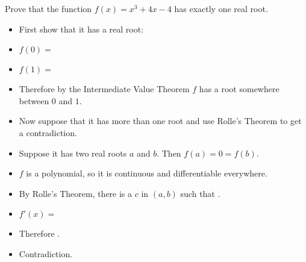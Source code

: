 \begin{frame}
\begin{example}
Prove that the function $f(x) = x^3 + 4x - 4$ has exactly one real root.
\begin{itemize}
\item<2->  First show that it has a real root:
\item<2-| alert@3-4>  $f(0) =$ 
\item<2-| alert@5-6>  $f(1) =$ 
\item<7->  Therefore by the Intermediate Value Theorem $f$ has a root somewhere between $0$ and $1$.
\item<8->  Now suppose that it has more than one root and use Rolle's Theorem to get a contradiction.
\item<9->  Suppose it has two real roots $a$ and $b$.  Then $f(a) = 0 = f(b)$.
\item<10->  $f$ is a polynomial, so it is continuous and differentiable everywhere.
\item<11->  By Rolle's Theorem, there is a $c$ in $(a,b)$ such that .
\item<12-| alert@12-13>  $f'(x) = $ 
\item<14->  Therefore .
\item<15-| alert@15>  Contradiction.
\end{itemize}
\end{example}
\end{frame}
